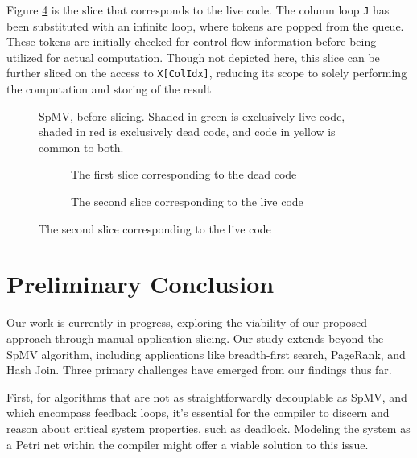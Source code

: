 \documentclass{acaces}
\begin{document}
Figure \ref{fig:secondSlice} is the slice that corresponds to the live code.
The column loop \texttt{J} has been substituted with an infinite loop,
where tokens are popped from the queue.
These tokens are initially checked for control flow information before being utilized for actual computation.
Though not depicted here, this slice can be further sliced on the access to \texttt{X[ColIdx]},
reducing its scope to solely performing the computation and storing of the result

\begin{figure}[ht]
  \centering
  
  \caption{SpMV, before slicing. Shaded in green is exclusively live code, shaded in red is exclusively dead code, and code in yellow is common to both. }
  \label{fig:spmv}
\end{figure}

\begin{figure}[ht]
  \centering

  \begin{subfigure}{1.0\textwidth}
    \centering
    
    \caption{The first slice corresponding to the dead code}
    \label{fig:firstSlice}
  \end{subfigure}

  \begin{subfigure}{1.0\textwidth}
    \centering
    
    \caption{The second slice corresponding to the live code}
    \label{fig:secondSlice}
  \end{subfigure}

\end{figure}

\section{Preliminary Conclusion}

Our work is currently in progress, exploring the viability of our proposed approach through manual application slicing.
Our study extends beyond the SpMV algorithm, including applications like breadth-first search, PageRank, and Hash Join.
Three primary challenges have emerged from our findings thus far.

First, for algorithms that are not as straightforwardly decouplable as SpMV,
and which encompass feedback loops,
it's essential for the compiler to discern and reason about critical system properties, such as deadlock.
Modeling the system as a Petri net within the compiler might offer a viable solution to this issue.
\end{document}
